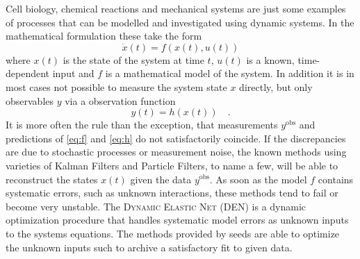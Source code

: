 Cell biology, chemical reactions and mechanical systems are just some examples of 
processes that can be modelled and investigated using dynamic systems. In the mathematical 
formulation these take the form
\begin{equation}
	\dot{x}(t) = f\left(x(t),u(t)\right) \label{eq:f}
\end{equation}
where $x(t)$ is the state of the system at time $t$, $u(t)$ is a known, time-dependent input and 
$f$ is a mathematical model of the system. In addition it is in most cases not possible 
to measure the system state $x$ directly, but only observables $y$ via a observation function 
\begin{equation}
y(t) = h\left(x(t)\right) \quad . \label{eq:h}
\end{equation}
It is more often the rule than the exception, that measurements $y^\text{obs}$ and predictions 
of \eqref{eq:f} and \eqref{eq:h} do not satisfactorily coincide. If the discrepancies are due 
to stochastic processes or measurement noise, the known methods using varieties of Kalman 
Filters and Particle Filters, to name a few, will be able to reconstruct the states $x(t)$ 
given the data $y^\text{obs}$. As soon as the model $f$ contains systematic errors, such as 
unknown interactions, these methods tend to fail or become very unstable. The \textsc{Dynamic 
Elastic Net} (DEN)\cite{DEN} is a dynamic optimization procedure that handles systematic model 
errors as unknown inputs to the systems equations. The methods provided by \textsf{seeds} are 
able to optimize the unknown inputs such to archive a satisfactory fit to given data. 